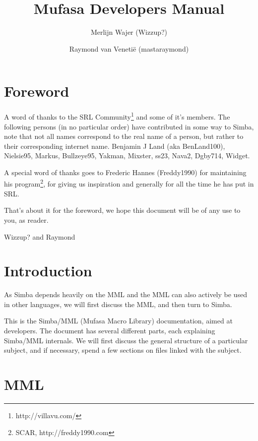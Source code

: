 \documentclass[a4paper, 10pt]{report} %
\begin{document}
\title{Mufasa Developers Manual}
\author{Merlijn Wajer (Wizzup?) \and Raymond van Veneti\"{e} (mastaraymond)}
\maketitle
\tableofcontents
% 

\chapter{Foreword}

A word of thanks to the SRL Community\footnote{http://villavu.com/} and some of
it's members.
The following persons (in no particular order) have contributed in some way to
Simba, note that not all names correspond to the real name of a person, but
rather to their corresponding internet name.
Benjamin J Land (aka BenLand100), Nielsie95, Markus, Bullzeye95,
Yakman, Mixster, ss23, Nava2, Dgby714, Widget.

A special word of thanks goes to Frederic Hannes (Freddy1990) for maintaining
his program\footnote{SCAR, http://freddy1990.com}, for giving us inspiration
and generally for all the time he has put in SRL.

That's about it for the foreword, we hope this document will be of any use to
you, as reader.

Wizzup? and Raymond

\chapter{Introduction}

As Simba depends heavily on the MML and the MML can also actively be used in 
other languages, we will first discuss the MML, and then turn to Simba.

This is the Simba/MML (Mufasa Macro Library) documentation, aimed at
developers. The document has several different parts, each explaining
Simba/MML internals. We will first discuss the general structure of a
particular subject, and if necessary, spend a few sections on files
linked with the subject.

\chapter{MML}
\end{document}
